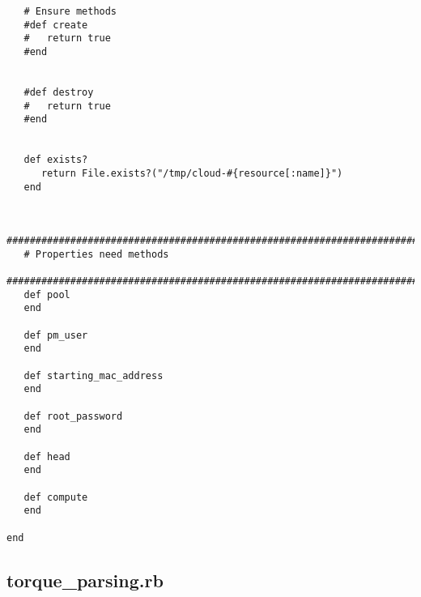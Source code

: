 \begin{lstlisting}
   # Ensure methods
   #def create
   #   return true
   #end
   

   #def destroy
   #   return true
   #end


   def exists?
      return File.exists?("/tmp/cloud-#{resource[:name]}")
   end
   
   
   #############################################################################
   # Properties need methods
   #############################################################################
   def pool
   end
   
   def pm_user
   end
   
   def starting_mac_address
   end
   
   def root_password
   end
   
   def head
   end
   
   def compute
   end
   
end
\end{lstlisting}


\subsection{torque\_parsing.rb}


